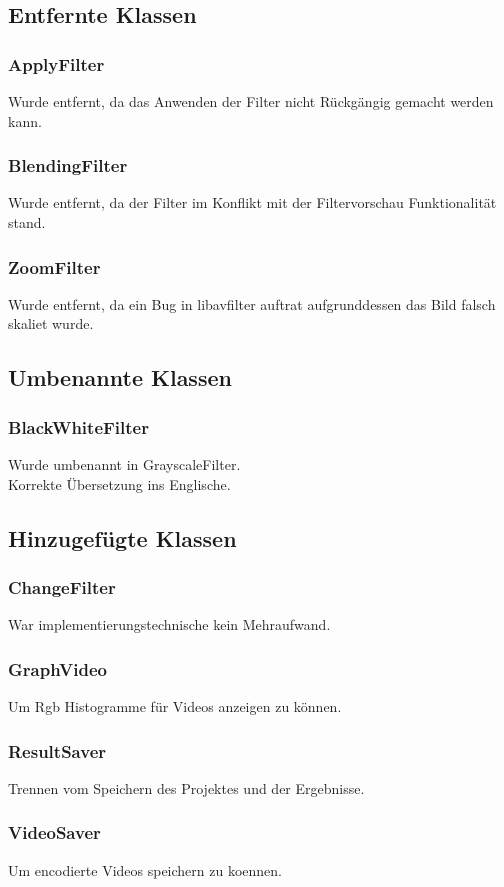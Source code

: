 \documentclass{scrartcl}
\begin{document}
{\subsection{Entfernte Klassen}
\bigskip
\subsubsection{ApplyFilter}
Wurde entfernt, da das Anwenden der Filter nicht Rückgängig gemacht werden kann.
\subsubsection{BlendingFilter}
Wurde entfernt, da der Filter im Konflikt mit der Filtervorschau Funktionalität stand.
\subsubsection{ZoomFilter}
Wurde entfernt, da ein Bug in libavfilter auftrat aufgrunddessen das Bild falsch skaliet wurde.
\bigskip
\subsection{Umbenannte Klassen}
\bigskip
\subsubsection{BlackWhiteFilter}
Wurde umbenannt in GrayscaleFilter.\\
Korrekte Übersetzung ins Englische.
\newpage
\subsection{Hinzugefügte Klassen}
\bigskip
\subsubsection{ChangeFilter}
War implementierungstechnische kein Mehraufwand.
\subsubsection{GraphVideo}
Um Rgb Histogramme für Videos anzeigen zu können.
\subsubsection{ResultSaver}
Trennen vom Speichern des Projektes und der Ergebnisse.
\subsubsection{VideoSaver}
Um encodierte Videos speichern zu koennen.
}
\end{document}
